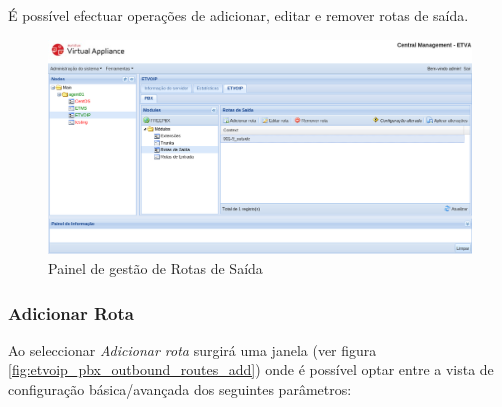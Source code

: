 É possível efectuar operações de adicionar, editar e remover rotas de saída.

\begin{figure}[H]
        \begin{center}
        \includegraphics[scale=0.4]{screenshots/etvoip_pbx_outbound_routes.png}
        \caption{Painel de gestão de Rotas de Saída}
        \label{fig:etvoip_pbx_outbound_routes}
        \end{center}
\end{figure}

\subsubsection{Adicionar Rota}
\label{sec:etvoip_pbx_outbound_routes_add}

Ao seleccionar \emph{Adicionar rota} surgirá uma janela (ver figura \ref{fig:etvoip_pbx_outbound_routes_add}) onde é possível optar entre a vista de configuração básica/avançada dos seguintes parâmetros:

